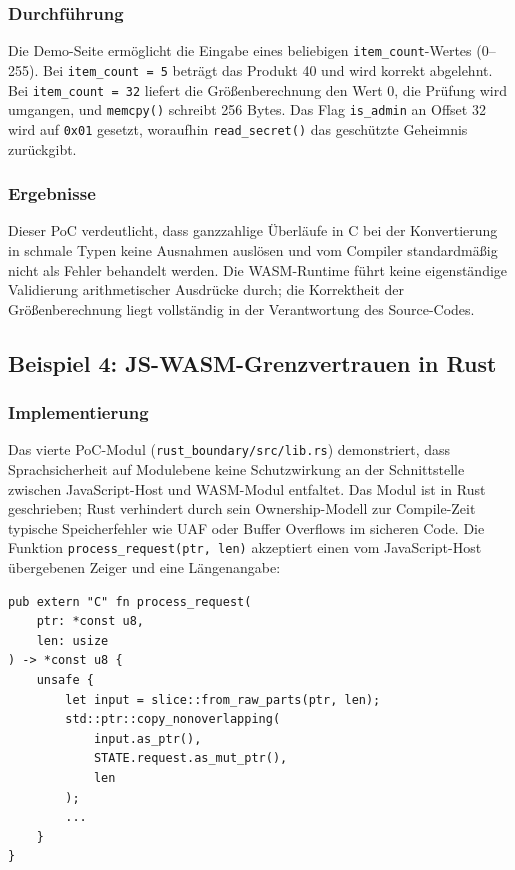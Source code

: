 \subsubsection{Durchführung}

Die Demo-Seite ermöglicht die Eingabe eines beliebigen \texttt{item\_count}-Wertes (0–255). Bei \texttt{item\_count = 5} beträgt das Produkt 40 und wird korrekt abgelehnt. Bei \texttt{item\_count = 32} liefert die Größenberechnung den Wert 0, die Prüfung wird umgangen, und \texttt{memcpy()} schreibt 256 Bytes. Das Flag \texttt{is\_admin} an Offset 32 wird auf \texttt{0x01} gesetzt, woraufhin \texttt{read\_secret()} das geschützte Geheimnis zurückgibt.

\subsubsection{Ergebnisse}

Dieser PoC verdeutlicht, dass ganzzahlige Überläufe in C bei der Konvertierung in schmale Typen keine Ausnahmen auslösen und vom Compiler standardmäßig nicht als Fehler behandelt werden. Die WASM-Runtime führt keine eigenständige Validierung arithmetischer Ausdrücke durch; die Korrektheit der Größenberechnung liegt vollständig in der Verantwortung des Source-Codes.

\subsection{Beispiel 4: JS-WASM-Grenzvertrauen in Rust}

\subsubsection{Implementierung}

Das vierte PoC-Modul (\texttt{rust\_boundary/src/lib.rs}) demonstriert, dass Sprachsicherheit auf Modulebene keine Schutzwirkung an der Schnittstelle zwischen JavaScript-Host und WASM-Modul entfaltet. Das Modul ist in Rust geschrieben; Rust verhindert durch sein Ownership-Modell zur Compile-Zeit typische Speicherfehler wie UAF oder Buffer Overflows im sicheren Code. Die Funktion \texttt{process\_request(ptr, len)} akzeptiert einen vom JavaScript-Host übergebenen Zeiger und eine Längenangabe:

\begin{verbatim}
pub extern "C" fn process_request(
    ptr: *const u8,
    len: usize
) -> *const u8 {
    unsafe {
        let input = slice::from_raw_parts(ptr, len);
        std::ptr::copy_nonoverlapping(
            input.as_ptr(),
            STATE.request.as_mut_ptr(),
            len
        );
        ...
    }
}
\end{verbatim}

